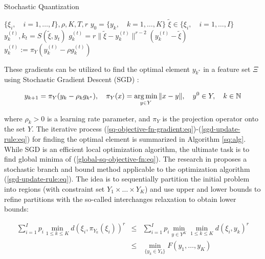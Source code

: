 \begin{algorithm}
    \caption{Stochastic Quantization}\label{sq:alg}
    \begin{algorithmic}[1]
    \Require $ \{ \xi_i, \quad i = 1, \ldots, I \}, \rho, K, T, r $
    \State $ y_0 = \{ y_k, \quad k = 1, \ldots, K \} $ 
        \State $ \tilde{\xi} \in \{ \xi_i, \quad i = 1, \ldots, I \} $ 
        \State $ y_k^{(t)}, k_t = S(\tilde{\xi}, y_t) $ 
        \State $ g_k^{(t)} = r \| \tilde{\xi} - y_k^{(t)} \|^{r - 2} (y_k^{(t)} - \tilde{\xi}) $ 
        \State $ y_k^{(t)} := \pi_Y (y_k^{(t)} - \rho g_k^{(t)}) $ 
    \EndFor
    \end{algorithmic}
\end{algorithm}

These gradients can be utilized to find the optimal element $y_{k^*}$ in a feature set $\Xi$ using Stochastic Gradient Descent (SGD) \cite{ermoliev1976stochastic,kiefer1952stochastic,Norkin_Kozyriev_Norkin_2024,Robbins_Monro_1951}:

\begin{equation}
    \label{sgd-update-rule:eq}
        y_{k+1} = \pi_Y (y_k - \rho_k g_{k^*}), \quad \pi_Y (x) = \operatorname*{arg\,min}_{y \in Y} \| x - y\|, \quad y^0 \in Y, \quad k \in \mathbb{N}
\end{equation}

\noindent where $\rho_k > 0$ is a learning rate parameter, and $\pi_Y$ is the projection operator onto the set $Y$. The iterative process (\ref{sq-objective-fn-gradient:eq})-(\ref{sgd-update-rule:eq}) for finding the optimal element is summarized in Algorithm \ref{sq:alg}. While SGD is an efficient local optimization algorithm, the ultimate task is to find global minima of (\ref{global-sq-objective-fn:eq}). The research in \cite{Norkin_Pflug_Ruszczynski_1998} proposes a stochastic branch and bound method applicable to the optimization algorithm (\ref{sgd-update-rule:eq}). The idea is to sequentially partition the initial problem into regions (with constraint set $Y_1 \times \ldots \times Y_K$) and use upper and lower bounds to refine partitions with the so-called interchanges relaxation to obtain lower bounds:

\begin{eqnarray}
    \label{sq-branch-bound:eq}
        \sum_{i=1}^I p_i \min_{1 \leq k \leq K} d(\xi_i, \pi_{Y_k} (\xi_i))^r
        &\leq& \sum_{i=1}^I p_i \min_{y \in Y^K} \min_{1 \leq k \leq K} d(\xi_i, y_k)^r \nonumber \\
        &\leq& \min_{\{ y_k \in Y_k \}} F(y_1, \ldots, y_K)
\end{eqnarray}

